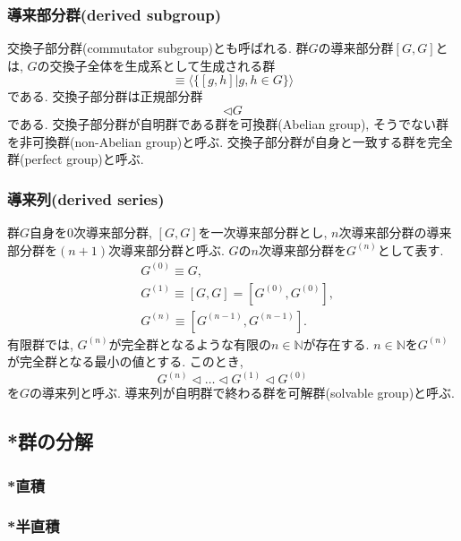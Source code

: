 \documentclass[11pt, a4paper]{jsarticle}
\begin{document}
\subsubsection{導来部分群(derived subgroup)}
交換子部分群(commutator subgroup)とも呼ばれる.
群$G$の導来部分群$[G,G]$とは, $G$の交換子全体を生成系として生成される群
\begin{equation}
	[G, G] \equiv \langle \{ [g,h] | g,h \in G \} \rangle
\end{equation}
である.
交換子部分群は正規部分群
\begin{equation}
	[G, G] \triangleleft G
\end{equation}
である.
交換子部分群が自明群である群を可換群(Abelian group), そうでない群を非可換群(non-Abelian group)と呼ぶ.
交換子部分群が自身と一致する群を完全群(perfect group)と呼ぶ.

\subsubsection{導来列(derived series)}
群$G$自身を0次導来部分群, $[G,G]$を一次導来部分群とし, $n$次導来部分群の導来部分群を$(n+1)$次導来部分群と呼ぶ.
$G$の$n$次導来部分群を$G^{(n)}$として表す.
\begin{equation}
\begin{split}
&G^{(0)} \equiv G, \\
&G^{(1)} \equiv [G,G] = [G^{(0)},G^{(0)}], \\
&G^{(n)} \equiv [G^{(n-1)},G^{(n-1)}].
\end{split}
\end{equation}
有限群では, $G^{(n)}$が完全群となるような有限の$n\in\mathbb{N}$が存在する.
$n\in\mathbb{N}$を$G^{(n)}$が完全群となる最小の値とする.
このとき,
\begin{equation}
G^{(n)} \triangleleft \dots \triangleleft G^{(1)} \triangleleft G^{(0)}
\end{equation}
を$G$の導来列と呼ぶ.
導来列が自明群で終わる群を可解群(solvable group)と呼ぶ.

\subsection{*群の分解}

\subsubsection{*直積}

\subsubsection{*半直積}
\end{document}
